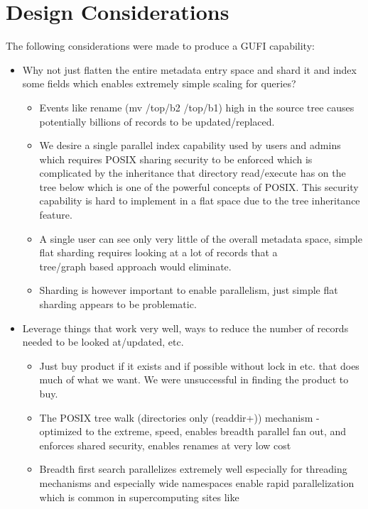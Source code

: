 \section{Design Considerations}

The following considerations were made to produce a GUFI capability:

\begin{itemize}
\item Why not just flatten the entire metadata entry space and shard
  it and index some fields which enables extremely simple scaling for
  queries?
  \begin{itemize}
  \item Events like rename (mv /top/b2 /top/b1) high in the source
    tree causes potentially billions of records to be
    updated/replaced.
  \item We desire a single parallel index capability used by users and
    admins which requires POSIX sharing security to be enforced which
    is complicated by the inheritance that directory read/execute has
    on the tree below which is one of the powerful concepts of POSIX.
    This security capability is hard to implement in a flat space due
    to the tree inheritance feature.
  \item A single user can see only very little of the overall metadata
    space, simple flat sharding requires looking at a lot of records
    that a \\ tree/graph based approach would eliminate.
  \item Sharding is however important to enable parallelism, just
    simple flat sharding appears to be problematic.
  \end{itemize}
\item Leverage things that work very well, ways to reduce the number
  of records needed to be looked at/updated, etc.
  \begin{itemize}
  \item Just buy product if it exists and if possible without lock in
    etc. that does much of what we want.  We were unsuccessful in
    finding the product to buy.
  \item The POSIX tree walk (directories only (readdir+)) mechanism -
    optimized to the extreme, speed, enables breadth parallel fan out,
    and enforces shared security, enables renames at very low cost
  \item Breadth first search parallelizes extremely well especially
    for threading mechanisms and especially wide namespaces enable
    rapid parallelization which is common in supercomputing sites like

\end{itemize}
\end{itemize}
